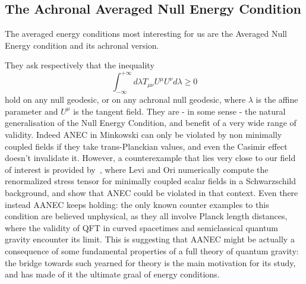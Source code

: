 \subsection{The Achronal Averaged Null Energy Condition}

The averaged energy conditions most interesting for us are the Averaged Null Energy condition and its achronal version.

\noindent
They ask respectively that the inequality
\begin{equation}
    \label{eq:ANEC}
    \int_{-\infty}^{+\infty} d\lambda T_{\mu\nu}U^{\mu}U^{\nu} d\lambda \ge 0    
\end{equation}
hold on any null geodesic, or on any achronal null geodesic, where \(\lambda\) is the affine parameter and \(U^{\mu}\) is the tangent field. They are - in some sense - the natural generalisation of the Null Energy Condition, and benefit of a very wide range of validity. 
\noindent
Indeed ANEC in Minkowski can only be violated by non minimally coupled fields if they take trans-Planckian values, and even the Casimir effect doesn't invalidate it.
However, a counterexample that lies very close to our field of interest is provided by~\cite[]{levi2016versatile}, where Levi and Ori numerically compute the renormalized stress tensor for minimally coupled scalar fields in a Schwarzschild background, and show that ANEC could be violated in that context. 
Even there instead AANEC keeps holding: the only known counter examples to this condition are believed unphysical, as they all involve Planck length distances, where the validity of QFT in curved spacetimes and semiclassical quantum gravity encounter its limit. This is suggesting that AANEC might be actually a consequence of some fundamental properties of a full theory of quantum gravity: the bridge towards such yearned for theory is the main motivation for its study, and has made of it the ultimate graal of energy conditions.

